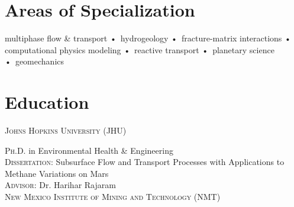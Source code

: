 \documentclass[11pt, letterpaper]{article}
\newcommand{\years}[1]{\marginnote{\scriptsize #1}}
\begin{document}

\section*{Areas of Specialization}
\begin{center}
    multiphase flow \& transport •\ hydrogeology •\ fracture-matrix interactions •\ \\
    computational physics modeling •\ reactive transport •\ planetary science •\ geomechanics 
\end{center}

\section*{Education}
\noindent
\newlength\q
\setlength{}

\years{2024}\textsc{Johns Hopkins University (JHU)}

    \noindent
    \textsc{Ph.D.} in Environmental Health \& Engineering\\
    \textsc{Dissertation:} Subsurface Flow and Transport Processes with
    Applications to Methane Variations on Mars\\
    \textsc{Advisor:} Dr. Harihar Rajaram \\

\years{2017}\textsc{New Mexico Institute of Mining and Technology (NMT)}
\end{document}
